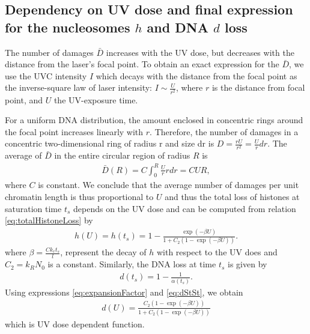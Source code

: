 \documentclass[12pt]{article}
\newcommand{\beq}{\begin{eqnarray}}
\newcommand{\eeq}{\end{eqnarray}}
\begin{document}
\subsection{Dependency on UV dose and final expression for the nucleosomes $h$ and DNA $d$ loss}
The number of damages $\bar{D}$ increases with the UV dose, but decreases with the distance from the laser's focal point. To obtain an exact expression for the $\bar{D}$, we use the UVC intensity $I$ which decays with the distance from the focal point as the inverse-square law of laser intensity: $I \sim \frac{U}{r^2}$, where $r$ is the distance from focal point, and $U$ the UV-exposure time.

For a uniform DNA distribution, the amount enclosed in concentric rings around the focal point increases linearly with $r$. Therefore, the number of damages in a concentric two-dimensional ring of radius r and size dr is ${D}= \frac{rU}{r^2}=\frac{U}{r}dr$. The average of $\bar{D}$ in the entire circular region of radius $R$ is
\beq
\bar{D}(R) = C\int_0^R \frac{U}{r} rdr = CUR,
\eeq
where $C$ is constant. We conclude that the average number of damages per unit chromatin length is thus proportional to $U$ and thus the total loss of histones at saturation time $t_{s}$ depends on the UV dose and can be computed from relation \ref{eq:totalHistoneLoss} by
\beq\label{eq:totalHiostoneLossVsUV}
h(U)=h(t_s)=1-\frac{\exp(-\beta U)}{ 1+C_2(1-\exp(-\beta U))}.
\eeq
where $\beta=\frac{Ck_rt_s}{l}$, represent the decay of $h$ with respect to the UV does and $C_2=k_RN_0$ is a constant. Similarly, the DNA loss at time $t_{s}$ is given by
\beq\label{eq:dStSt}
d(t_s)= 1-\frac{1}{\alpha(t_s)}.
\eeq
Using expressions \ref{eq:expansionFactor} and \ref{eq:dStSt}, we obtain
\beq\label{eq:dnaLoss}
d(U)= \frac{C_2(1-\exp(-\beta U))}{1+C_2(1-\exp(-\beta U))}
\eeq
which is UV dose dependent function.

\end{document}
